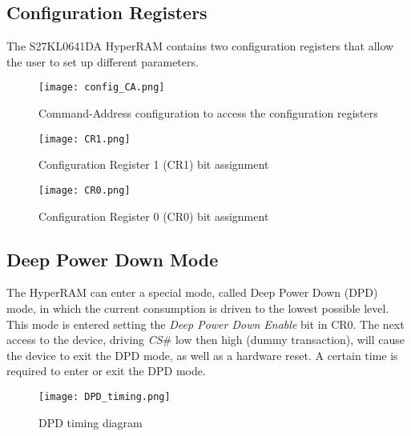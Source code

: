 \documentclass[10pt, english, a4paper, titlepage, oneside]{book}
\begin{document}
\subsection{Configuration Registers}
\vspace{2mm}
The S27KL0641DA HyperRAM contains two configuration registers that allow the user to set up different parameters.
\vspace{1mm}
\begin{figure}[H]
    \centering
    \texttt{[image: config\_CA.png]}
    \vspace{1mm}
    \caption{Command-Address configuration to access the configuration registers}
    \label{config_CA}
\end{figure}
\begin{figure}[H]
    \centering
    \texttt{[image: CR1.png]}
    \vspace{1mm}
    \caption{Configuration Register 1 (\acrshort{CR1}) bit assignment}
    \label{CR1}
\end{figure}
\begin{figure}[H]
    \centering
    \texttt{[image: CR0.png]}
    \vspace{1mm}
    \caption{Configuration Register 0 (\acrshort{CR0}) bit assignment}
    \label{CR0}
\end{figure}
\vspace{1mm}
\subsection{Deep Power Down Mode}
\vspace{2mm}
The HyperRAM can enter a special mode, called Deep Power Down (DPD) mode, in which the current consumption is driven to the lowest possible level. This mode is entered setting the \textit{Deep Power Down Enable} bit in CR0. The next access to the device, driving \textit{CS}\# low then high (dummy transaction), will cause the device to exit the DPD mode, as well as a hardware reset. A certain time is required to enter or exit the DPD mode.
\vspace{4mm}
\begin{figure}[H]
    \centering
    \texttt{[image: DPD\_timing.png]}
    \vspace{3mm}
    \caption{DPD timing diagram}
    \label{DPD_timing}
\end{figure}
\vspace{1mm}
\end{document}
